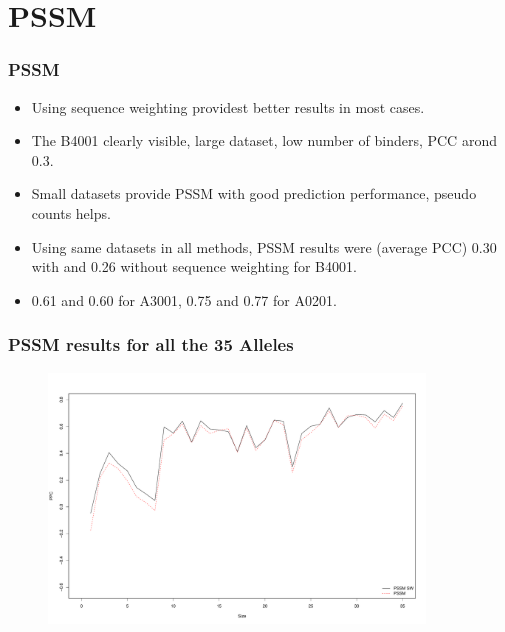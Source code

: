 \documentclass[presentation]{beamer}   %
\begin{document}
\section{PSSM}
\begin{frame}
 \frametitle{PSSM}
 \begin{itemize}
\item Using sequence weighting providest better results in most cases. \pause
\item The B4001 clearly visible, large dataset, low number of binders, PCC arond 0.3. \pause
\item Small datasets provide PSSM with good prediction performance, pseudo counts helps. \pause
\item Using same datasets in all methods, PSSM results were (average PCC) 0.30 with and 0.26 without sequence weighting for B4001. \pause
\item 0.61 and 0.60 for A3001, 0.75 and 0.77 for A0201.
\end{itemize}
\end{frame}

\begin{frame}
\frametitle{PSSM results for all the 35 Alleles}
 \begin{figure}[ht]
  \begin{center}
   \includegraphics[width=10cm]{fig/pssmLN1.pdf}
  \end{center}
 \end{figure}
\end{frame}
\end{document}
